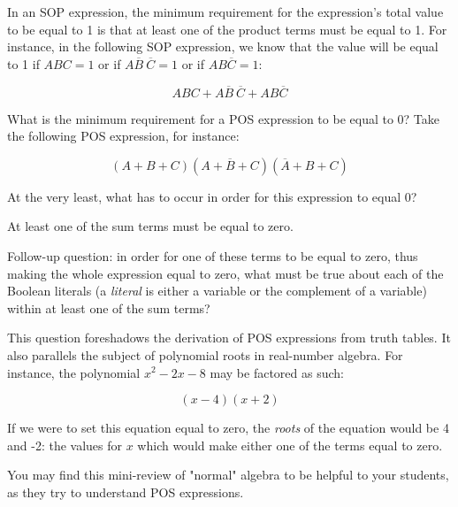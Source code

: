

In an SOP expression, the minimum requirement for the expression's total value to be equal to 1 is that at least one of the product terms must be equal to 1.  For instance, in the following SOP expression, we know that the value will be equal to 1 if $ABC = 1$ or if $A\overline{B}\> \overline{C} = 1$ or if $AB\overline{C} = 1$:

$$ABC + A\overline{B}\> \overline{C} + AB\overline{C}$$

What is the minimum requirement for a POS expression to be equal to 0?  Take the following POS expression, for instance:

$$(A + B + C)(A + \overline{B} + C)(\overline{A} + B + C)$$

At the very least, what has to occur in order for this expression to equal 0?







At least one of the sum terms must be equal to zero.

\vskip 10pt

Follow-up question: in order for one of these terms to be equal to zero, thus making the whole expression equal to zero, what must be true about each of the Boolean literals (a {\it literal} is either a variable or the complement of a variable) within at least one of the sum terms?







This question foreshadows the derivation of POS expressions from truth tables.  It also parallels the subject of polynomial roots in real-number algebra.  For instance, the polynomial $x^2 - 2x - 8$ may be factored as such:

$$(x - 4)(x + 2)$$

If we were to set this equation equal to zero, the {\it roots} of the equation would be 4 and -2: the values for $x$ which would make either one of the terms equal to zero.

You may find this mini-review of "normal" algebra to be helpful to your students, as they try to understand POS expressions.




